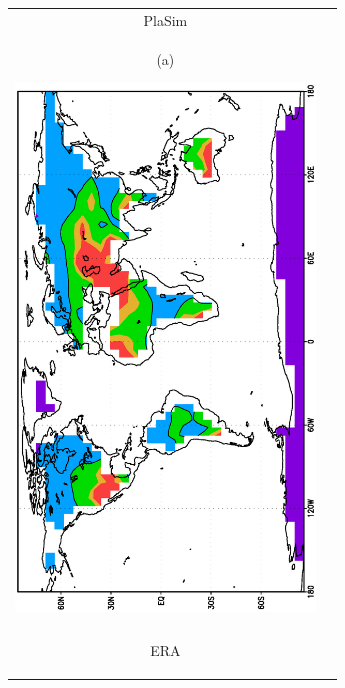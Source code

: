 \documentclass[12pt,a4paper,twoside,openright,headinclude,liststotoc,bibtotoc]{scrreprt}
\begin{document}
\begin{figure}[b]
\begin{tabular}{cc}
\hspace{-0.5cm}PlaSim 
\\
\begin{minipage}{1.0\textwidth}
\begin{center}
\begin{scriptsize}(a)\end{scriptsize}\hspace{-1cm}\includegraphics[height=14.0cm,angle=-90]{eps/budyko_PLAS_ANMnn.eps} 
\end{center}
\end{minipage}
\\
\\
\begin{minipage}{1.0\textwidth}\hspace{7.9cm}ERA\vspace{-0.6cm}
\begin{center}

\end{center}
\end{minipage}
\end{tabular}
\end{figure}
\end{document}
